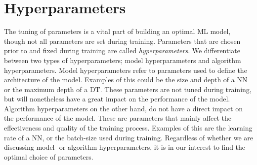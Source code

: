\section{Hyperparameters}
The tuning of parameters is a vital part of building an optimal \ac{ML}
model, though not all parameters are set during training. Parameters 
that are chosen prior to and fixed during training are called \emph{hyperparameters}. We differentiate
between two types of hyperparameters; model hyperparameters and algorithm 
hyperparameters. Model hyperparameters refer to parameters used to define the 
architecture of the model. Examples of this could be the size and depth of 
a \ac{NN} or the maximum depth of a \ac{DT}. These parameters are not tuned
during training, but will nonetheless have a great impact on the performance 
of the model. Algorithm hyperparameters on the other hand, do not have a direct impact 
on the performance of the model. These are parameters that mainly affect the 
effectiveness and quality of the training process. Examples of this are the 
learning rate of a \ac{NN}, or the batch-size used during training. Regardless 
of whether we are discussing model- or algorithm hyperparameters, it is in our interest
to find the optimal choice of parameters. 